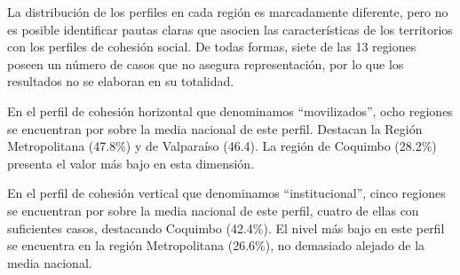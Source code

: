 \documentclass[
  12pt,
]{book}
\begin{document}
\begin{table}

\caption{\label{tab:clases-region}Distribucion de las clases de cohesion social por region}
\centering
{}
\end{table}

La distribución de los perfiles en cada región es marcadamente diferente, pero no es posible identificar pautas claras que asocien las características de los territorios con los perfiles de cohesión social. De todas formas, siete de las 13 regiones poseen un número de casos que no asegura representación, por lo que los resultados no se elaboran en su totalidad.

En el perfil de cohesión horizontal que denominamos ``movilizados'', ocho regiones se encuentran por sobre la media nacional de este perfil. Destacan la Región Metropolitana (47.8\%) y de Valparaíso (46.4). La región de Coquimbo (28.2\%) presenta el valor más bajo en esta dimensión.

En el perfil de cohesión vertical que denominamos ``institucional'', cinco regiones se encuentran por sobre la media nacional de este perfil, cuatro de ellas con suficientes casos, destacando Coquimbo (42.4\%). El nivel más bajo en este perfil se encuentra en la región Metropolitana (26.6\%), no demasiado alejado de la media nacional.
\end{document}
